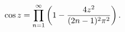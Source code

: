 \[\mathop{\cos\/}\nolimits z=\prod_{n=1}^{\infty}\left(1-\frac{4z^{2}}{(2n-1)^{2%
}\pi^{2}}\right).\]